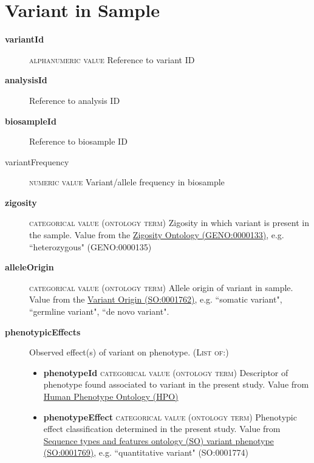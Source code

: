 \documentclass[a4paper, 10pt]{article}        %
\begin{document}
 
 
   \section*{ {\color{teal} Variant in Sample}}
  
  \begin{description}
  	\item[\textbf{variantId}]  {\textsc{alphanumeric value}} Reference to variant ID 	
	\item[\textbf{analysisId}] Reference to analysis ID
	\item[\textbf{biosampleId}] Reference to biosample ID
	\item[variantFrequency] {\textsc{numeric value}} Variant/allele frequency in biosample
	\item[\textbf{zigosity}] {\textsc{categorical value (ontology term)}} Zigosity in which variant is present in the sample. Value from the \href{https://github.com/monarch-initiative/GENO-ontology/}{Zigosity Ontology (GENO:0000133)}, e.g. ``heterozygous" (GENO:0000135)
	\item[\textbf{alleleOrigin}] {\textsc{categorical value (ontology term)}} Allele origin of variant in sample. Value from the \href{http://purl.obolibrary.org/obo/SO_0001762}{Variant Origin (SO:0001762)}, e.g. ``somatic variant", ``germline variant", ``de novo variant". %
	\item[\textbf{phenotypicEffects}] Observed effect(s) of variant on phenotype. {\textsc{(List of:)}}
	\begin{itemize}
				\item[] \textbf{phenotypeId} {\textsc{categorical value (ontology term)}} Descriptor of phenotype found associated to variant in the present study. Value from \href{http:purl.obolibrary.org/obo/HP_0000001}{Human Phenotype Ontology (HPO)}
				\item[] \textbf{phenotypeEffect} {\textsc{categorical value (ontology term)}} Phenotypic effect classification determined in the present study. Value from \href{http://purl/obolibrary.org/obo/SO_0001769}{Sequence types and features ontology (SO) variant phenotype (SO:0001769)}, e.g. ``quantitative variant" (SO:0001774)

\end{itemize}
\end{description}
\end{document}

